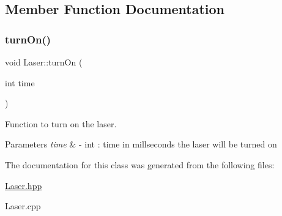 \subsection{Member Function Documentation}
\mbox{\label{class_laser_a8203b49ef026606ec58976d23c5b5bb9}} 
\subsubsection{\texorpdfstring{turn\+On()}{turnOn()}}
{\footnotesize\ttfamily void Laser\+::turn\+On (\begin{DoxyParamCaption}\item[{int}]{time }\end{DoxyParamCaption})}



Function to turn on the laser. 


\begin{DoxyParams}{Parameters}
{\em time} & -\/ int \+: time in millseconds the laser will be turned on \\
\hline
\end{DoxyParams}


The documentation for this class was generated from the following files\+:\begin{DoxyCompactItemize}
\item 
\hyperlink{_laser_8hpp}{Laser.\+hpp}\item 
Laser.\+cpp\end{DoxyCompactItemize}
